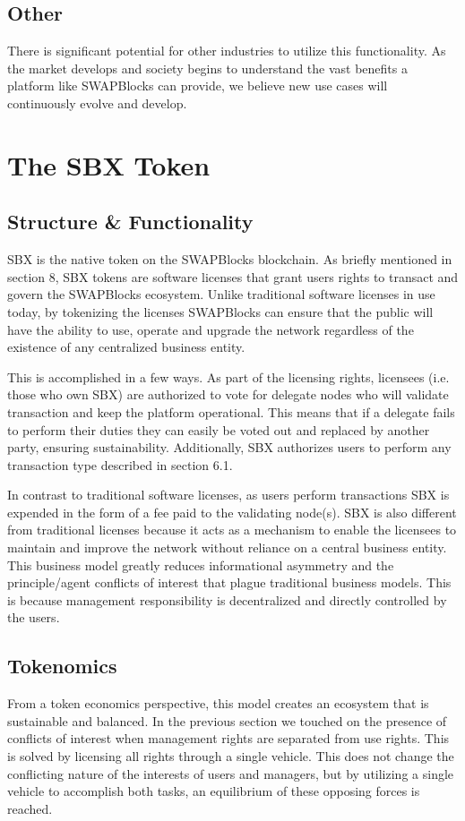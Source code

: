 \documentclass[12pt]{article}
\begin{document}
\subsection{Other}

There is significant potential for other industries to utilize this functionality. As the market develops and society begins to understand the vast benefits a platform like SWAPBlocks can provide, we believe new use cases will continuously evolve and develop.

\section{The SBX Token}

\subsection{Structure \& Functionality}
SBX is the native token on the SWAPBlocks blockchain. As briefly mentioned in section 8, SBX tokens are software licenses that grant users rights to transact and govern the SWAPBlocks ecosystem. Unlike traditional software licenses in use today, by tokenizing the licenses SWAPBlocks can ensure that the public will have the ability to use, operate and upgrade the network regardless of the existence of any centralized business entity.

This is accomplished in a few ways. As part of the licensing rights, licensees (i.e. those who own SBX) are authorized to vote for delegate nodes who will validate transaction and keep the platform operational. This means that if a delegate fails to perform their duties they can easily be voted out and replaced by another party, ensuring sustainability. Additionally, SBX authorizes users to perform any transaction type described in section 6.1.

In contrast to traditional software licenses, as users perform transactions SBX is expended in the form of a fee paid to the validating node(s). SBX is also different from traditional licenses because it acts as a mechanism to enable the licensees to maintain and improve the network without reliance on a central business entity. This business model greatly reduces informational asymmetry and the principle/agent conflicts of interest that plague traditional business models. This is because management responsibility is decentralized and directly controlled by the users.


\subsection{Tokenomics}
From a token economics perspective, this model creates an ecosystem that is sustainable and balanced. In the previous section we touched on the presence of conflicts of interest when management rights are separated from use rights. This is solved by licensing all rights through a single vehicle. This does not change the conflicting nature of the interests of users and managers, but by utilizing a single vehicle to accomplish both tasks, an equilibrium of these opposing forces is reached.
\end{document}
